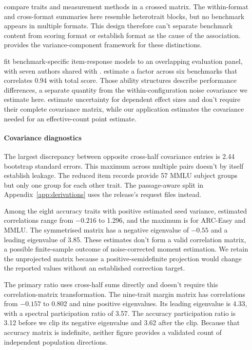 \citet{campbell1959} compare traits and measurement methods in a crossed matrix. The within-format and cross-format summaries here resemble heterotrait blocks, but no benchmark appears in multiple formats. This design therefore can't separate benchmark content from scoring format or establish format as the cause of the association. \citet{brennan2001} provides the variance-component framework for these distinctions.

\citet{hofmann2025} fit benchmark-specific item-response models to an overlapping evaluation panel, with seven authors shared with \citet{heineman2025}. \citet{kipnis2024} estimate a factor across six benchmarks that correlates 0.94 with total score. Those ability structures describe performance differences, a separate quantity from the within-configuration noise covariance we estimate here. \citet{hedges2010} estimate uncertainty for dependent effect sizes and don't require their complete covariance matrix, while our application estimates the covariance needed for an effective-count point estimate.


\paragraph{Covariance diagnostics}
The largest discrepancy between opposite cross-half covariance entries is 2.44 bootstrap standard errors. This maximum across multiple pairs doesn't by itself establish leakage. The reduced item records provide 57 MMLU subject groups but only one group for each other trait. The passage-aware split in Appendix~\ref{app:derivations} uses the release's request files instead.

Among the eight accuracy traits with positive estimated seed variance, estimated correlations range from $-0.216$ to 1.296, and the maximum is for ARC-Easy and MMLU. The symmetrised matrix has a negative eigenvalue of $-0.55$ and a leading eigenvalue of 3.85. These estimates don't form a valid correlation matrix, a possible finite-sample outcome of noise-corrected moment estimation. We retain the unprojected matrix because a positive-semidefinite projection would change the reported values without an established correction target.

The primary ratio uses cross-half sums directly and doesn't require this correlation-matrix transformation. The nine-trait margin matrix has correlations from $-0.157$ to 0.802 and nine positive eigenvalues. Its leading eigenvalue is 4.33, with a spectral participation ratio of 3.57. The accuracy participation ratio is 3.12 before we clip its negative eigenvalue and 3.62 after the clip. Because that accuracy matrix is indefinite, neither figure provides a validated count of independent population directions.


